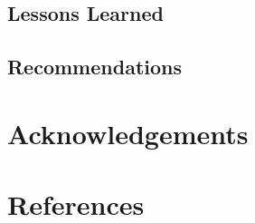 \documentclass[a4paper,12pt,twoside]{article}
\begin{document}
\subsection{Lessons Learned}

    \begin{multicols}{2}
    \lipsum[0-5]
    \end{multicols}
    
\subsection{Recommendations}

    \begin{multicols}{2}
    \lipsum[0-5]
    \end{multicols}

\section{Acknowledgements}

    \begin{multicols}{2}
    \lipsum[0-5]
    \end{multicols}

\section{References}

    \begin{multicols}{2}
    \lipsum[0-5]
    \end{multicols}
\end{document}
